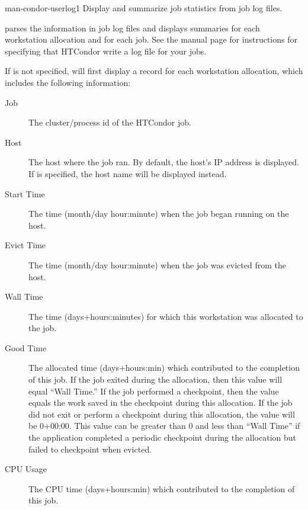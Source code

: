 \begin{ManPage}{}{man-condor-userlog}{1}
{Display and summarize job statistics from job log files.}

\Synopsis {}

\Description
{} parses the information in job log files and displays
summaries for each workstation allocation and for each job.  See the
 manual page for
instructions for specifying that HTCondor write a log file for your
jobs.

If  is not specified,  will first display
a record for each workstation allocation, which includes the following
information:

\begin{description}
\item[Job] The cluster/process id of the HTCondor job.
\item[Host] The host where the job ran.  By default, the host's IP
address is displayed.  If  is specified, the host name
will be displayed instead.
\item[Start Time] The time (month/day hour:minute) when the job began
running on the host.
\item[Evict Time] The time (month/day hour:minute) when
the job was evicted from the host.
\item[Wall Time] The time (days+hours:minutes) for which this workstation was
allocated to the job.
\item[Good Time] The allocated time (days+hours:min) which
contributed to the completion of this job.  If the job exited during
the allocation, then this value will equal ``Wall Time.''  If the job
performed a checkpoint, then the value equals the work saved in
the checkpoint during this allocation.  If the job did not exit or
perform a checkpoint during this allocation, the value will be 0+00:00.
This value can be greater than 0 and less than ``Wall Time'' if the
application completed a periodic checkpoint during the allocation but
failed to checkpoint when evicted.
\item[CPU Usage] The CPU time (days+hours:min) which contributed to
the completion of this job.
\end{description}


\end{ManPage}
